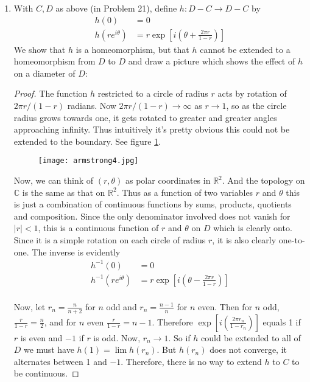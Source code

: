 \documentclass{book}
\begin{document}
\begin{enumerate}
    \item   With $C,D$ as above (in Problem 21), define $h:D-C\rightarrow D-C$ by
        \begin{align*}
            h(0) & = 0 \\
            h(re^{i\theta}) & =r\exp\left[i\left(\theta+\frac{2\pi r}{1-r}\right)\right]
        \end{align*}
        We show that $h$ is a homeomorphism, but that $h$ cannot be extended to a homeomorphism from $D$ to $D$ and draw a picture which shows the effect of $h$ on a diameter of $D$: 
        \begin{proof} The function $h$ restricted to a circle of radius $r$ acts by rotation of $2\pi r/(1-r)$ radians.  Now $2\pi r/(1-r)\rightarrow\infty$ as $r\rightarrow 1$, so as the circle radius grows towards one, it gets rotated to greater and greater angles approaching infinity.  Thus intuitively it's pretty obvious this could not be extended to the boundary. See figure \hyperref[fig:1.9]{\ref{fig:1.9}}.
            \begin{figure}
                \centering
                \texttt{[image: armstrong4.jpg]}
                \label{fig:1.9}
            \end{figure}
            \par Now, we can think of $(r,\theta)$ as polar coordinates in $\mathbb R^2$.  And the topology on $\mathbb C$ is the same as that on $\mathbb R^2$.    Thus as a function of two variables $r$ and $\theta$ this is just a combination of continuous functions by sums, products, quotients and composition.  Since the only denominator involved does not vanish for $|r|<1$, this is a continuous function of $r$ and $\theta$ on $D$ which is clearly onto.  Since it is a simple rotation on each circle of radius $r$, it is also clearly one-to-one.  The inverse is evidently
            \begin{align*}
                h^{-1}(0) & =0 \\
                h^{-1}(re^{i\theta}) & = r\exp\left[i\left(\theta-\frac{2\pi r}{1-r}\right)\right] \\
            \end{align*}
            \par Now, let $r_n=\frac{n}{n+2}$ for $n$ odd and $r_n=\frac{n-1}{n}$ for $n$ even.  Then for $n$ odd, $\frac{r}{1-r}=\frac n2$, and for $n$ even $\frac{r}{1-r}=n-1$.  Therefore $\exp\left[i\left(\frac{2\pi r_n}{1-r_n}\right)\right]$ equals 1 if $r$ is even and $-1$ if $r$ is odd.  Now, $r_n\rightarrow 1$.  So if $h$ could be extended to all of $D$ we must have $h(1)=\lim h(r_n)$.  But $h(r_n)$ does not converge, it alternates between 1 and $-1$.  Therefore, there is no way to extend $h$ to $C$ to be continuous.
        \end{proof}


\end{enumerate}
\end{document}
